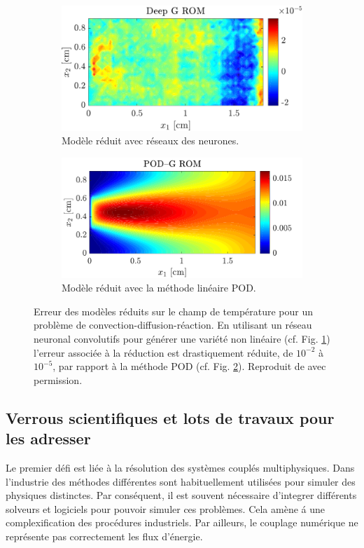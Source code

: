 \documentclass[12pt, french]{article}
\begin{document}
	\begin{figure}[t]
		\begin{subfigure}[t]{0.465\textwidth}
			\includegraphics[width=\columnwidth]{DGROM_T_param1.pdf} 
			\caption{Modèle réduit avec réseaux des neurones.}
			\label{fig:DG_ROM}
		\end{subfigure}\hfill
		\begin{subfigure}[t]{0.48\textwidth}
			\includegraphics[width=\columnwidth]{GROM_T_param1.pdf}%
			\caption{Modèle réduit avec la méthode linéaire POD.}
			\label{fig:POD_ROM}
		\end{subfigure}
		\caption[]{Erreur des modèles réduits sur le champ de température pour un problème de convection-diffusion-réaction. En utilisant un réseau neuronal convolutifs pour générer une variété non linéaire (cf. Fig. \ref{fig:DG_ROM}) l'erreur associée à la réduction  est drastiquement réduite, de $10^{-2}$ à $10^{-5}$, par rapport à la méthode POD (cf. Fig. \ref{fig:POD_ROM}). Reproduit de \cite{lee2020} avec permission.}%
		\label{fig:deepROM}%
	\end{figure}
	
	
	\subsection{Verrous scientifiques et lots de travaux pour les adresser}
	Le premier défi est liée \`a la résolution des systèmes couplés multiphysiques.  Dans l'industrie des méthodes différentes sont habituellement utilisées pour simuler des physiques distinctes. Par conséquent, il est souvent nécessaire d'integrer différents solveurs et logiciels pour pouvoir simuler ces problèmes. Cela amène \'a une complexification des procédures industriels. Par ailleurs, le couplage numérique ne représente pas correctement les flux d’énergie. \\
	
\end{document}
